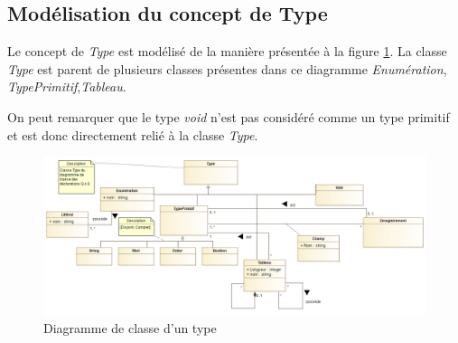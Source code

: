 
\subsection{Modélisation du concept de Type}
\label{sec:question8}

Le concept de \emph{Type} est modélisé de la manière présentée à la figure \ref{fig:type}. La classe \emph{Type} est parent de plusieurs classes présentes dans ce diagramme \emph{Enumération}, \emph{TypePrimitif},\emph{Tableau}. 

On peut remarquer que le type \emph{void} n'est pas considéré comme un type primitif et est donc directement relié à la classe \emph{Type}. 

\begin{figure}
	\centering
	\includegraphics[width=500pt]{assets/class__Type}
	\caption{Diagramme de classe d'un type}
	\label{fig:type}
\end{figure}
